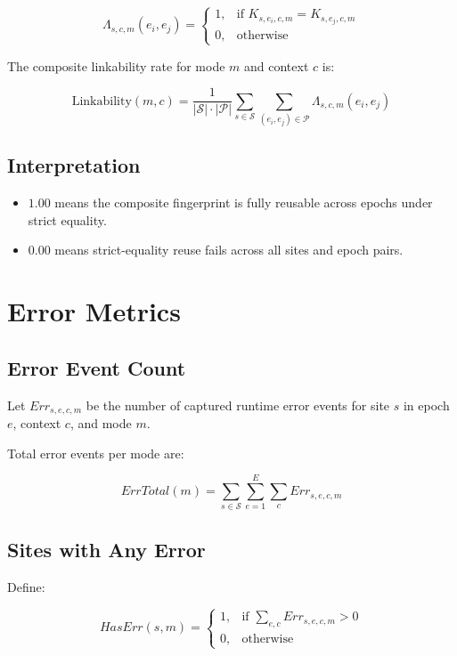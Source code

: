 \documentclass[11pt]{report}
\begin{document}
\[
\Lambda_{s,c,m}(e_i,e_j) =
\begin{cases}
1, & \text{if } K_{s,e_i,c,m} = K_{s,e_j,c,m} \\
0, & \text{otherwise}
\end{cases}
\]

The composite linkability rate for mode $m$ and context $c$ is:

\[
\text{Linkability}(m,c) =
\frac{1}{|\mathcal{S}| \cdot |\mathcal{P}|}
\sum_{s \in \mathcal{S}} \sum_{(e_i,e_j)\in\mathcal{P}}
\Lambda_{s,c,m}(e_i,e_j)
\]

\subsection{Interpretation}

\begin{itemize}
    \item $1.00$ means the composite fingerprint is fully reusable across epochs under strict equality.
    \item $0.00$ means strict-equality reuse fails across all sites and epoch pairs.
\end{itemize}

\section{Error Metrics}

\subsection{Error Event Count}

Let $Err_{s,e,c,m}$ be the number of captured runtime error events for site $s$ in epoch $e$, context $c$, and mode $m$.

Total error events per mode are:

\[
ErrTotal(m) = \sum_{s\in\mathcal{S}} \sum_{e=1}^{E} \sum_{c}
Err_{s,e,c,m}
\]

\subsection{Sites with Any Error}

Define:

\[
HasErr(s,m) =
\begin{cases}
1, & \text{if } \sum_{e,c} Err_{s,e,c,m} > 0 \\
0, & \text{otherwise}
\end{cases}
\]
\end{document}
